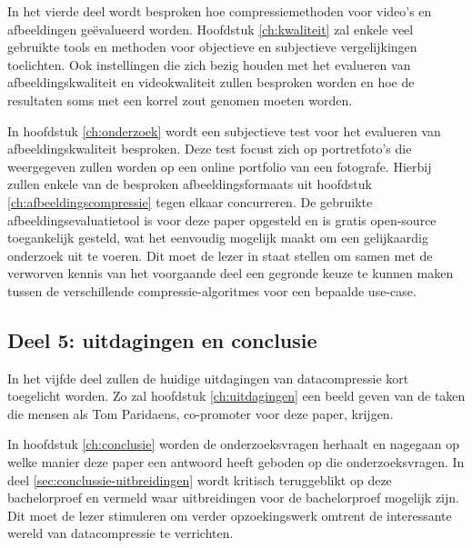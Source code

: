 In het vierde deel wordt besproken hoe compressiemethoden voor video's en afbeeldingen geëvalueerd worden. Hoofdstuk \ref{ch:kwaliteit} zal enkele veel gebruikte tools en methoden voor objectieve en subjectieve vergelijkingen toelichten. Ook instellingen die zich bezig houden met het evalueren van afbeeldingskwaliteit en videokwaliteit zullen besproken worden en hoe de resultaten soms met een korrel zout genomen moeten worden.

In hoofdstuk \ref{ch:onderzoek} wordt een subjectieve test voor het evalueren van afbeeldingskwaliteit besproken. Deze test focust zich op portretfoto's die weergegeven zullen worden op een online portfolio van een fotografe. Hierbij zullen enkele van de besproken \glspl{afbeeldingsformaat} uit hoofdstuk \ref{ch:afbeeldingscompressie} tegen elkaar concurreren. De gebruikte \gls{afbeeldingsevaluatietool} is voor deze paper opgesteld en is gratis \gls{open-source} toegankelijk gesteld, wat het eenvoudig mogelijk maakt om een gelijkaardig onderzoek uit te voeren. Dit moet de lezer in staat stellen om samen met de verworven kennis van het voorgaande deel een gegronde keuze te kunnen maken tussen de verschillende \glspl{compressie-algoritme} voor een bepaalde \gls{use-case}.

\subsection{Deel 5: uitdagingen en conclusie}
\label{sec:opzet-bachelorproef-deel-5}

In het vijfde deel zullen de huidige uitdagingen van \gls{datacompressie} kort toegelicht worden. Zo zal hoofdstuk \ref{ch:uitdagingen} een beeld geven van de taken die mensen als Tom Paridaens, co-promoter voor deze paper, krijgen.

In hoofdstuk \ref{ch:conclusie} worden de onderzoeksvragen herhaalt en nagegaan op welke manier deze paper een antwoord heeft geboden op die onderzoeksvragen. In deel \ref{sec:conclussie-uitbreidingen} wordt kritisch teruggeblikt op deze bachelorproef en vermeld waar uitbreidingen voor de bachelorproef mogelijk zijn. Dit moet de lezer stimuleren om verder opzoekingswerk omtrent de interessante wereld van \gls{datacompressie} te verrichten.